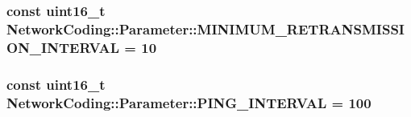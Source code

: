 \subsubsection[{\texorpdfstring{M\+I\+N\+I\+M\+U\+M\+\_\+\+R\+E\+T\+R\+A\+N\+S\+M\+I\+S\+S\+I\+O\+N\+\_\+\+I\+N\+T\+E\+R\+V\+AL}{MINIMUM_RETRANSMISSION_INTERVAL}}]{\setlength{\rightskip}{0pt plus 5cm}const uint16\+\_\+t Network\+Coding\+::\+Parameter\+::\+M\+I\+N\+I\+M\+U\+M\+\_\+\+R\+E\+T\+R\+A\+N\+S\+M\+I\+S\+S\+I\+O\+N\+\_\+\+I\+N\+T\+E\+R\+V\+AL = 10}\hypertarget{namespace_network_coding_1_1_parameter_ad8178c8021f7e03275b8c769037b705c}{}\label{namespace_network_coding_1_1_parameter_ad8178c8021f7e03275b8c769037b705c}
\subsubsection[{\texorpdfstring{P\+I\+N\+G\+\_\+\+I\+N\+T\+E\+R\+V\+AL}{PING_INTERVAL}}]{\setlength{\rightskip}{0pt plus 5cm}const uint16\+\_\+t Network\+Coding\+::\+Parameter\+::\+P\+I\+N\+G\+\_\+\+I\+N\+T\+E\+R\+V\+AL = 100}\hypertarget{namespace_network_coding_1_1_parameter_aac717e068a7f4c5516073e94ef454b0b}{}\label{namespace_network_coding_1_1_parameter_aac717e068a7f4c5516073e94ef454b0b}

